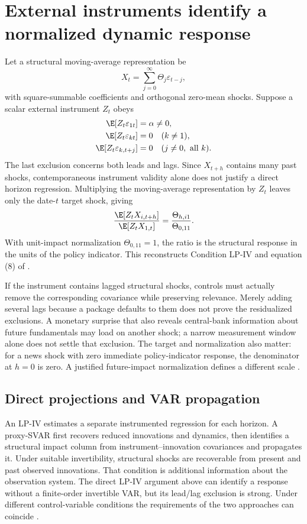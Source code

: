 \section{External instruments identify a normalized dynamic response}
\label{r3:lpiv}
Let a structural moving-average representation be
\[
 X_t=\sum_{j=0}^\infty\Theta_j\varepsilon_{t-j},
\]
with square-summable coefficients and orthogonal zero-mean shocks.
Suppose a scalar external instrument $Z_t$ obeys
\begin{align*}
 \E[Z_t\varepsilon_{1t}]&=\alpha\ne0,\\
 \E[Z_t\varepsilon_{kt}]&=0\quad(k\ne1),\\
 \E[Z_t\varepsilon_{k,t+j}]&=0\quad(j\ne0,\ \text{all }k).
\end{align*}
The last exclusion concerns both leads and lags. Since $X_{t+h}$
contains many past shocks, contemporaneous instrument validity alone
does not justify a direct horizon regression. Multiplying the
moving-average representation by $Z_t$ leaves only the date-$t$
target shock, giving
\begin{equation}
 \frac{\E[Z_tX_{i,t+h}]}{\E[Z_tX_{1,t}]}
       =\frac{\Theta_{h,i1}}{\Theta_{0,11}}.
 \label{r3:lpiv-ratio}
\end{equation}
With unit-impact normalization $\Theta_{0,11}=1$, the ratio is the
structural response in the units of the policy indicator.
This reconstructs Condition LP-IV and equation (8) of
\citet[Sections 2.2--2.3]{stock2018}.

If the instrument contains lagged structural shocks, controls must
actually remove the corresponding covariance while preserving
relevance. Merely adding several lags because a package defaults to
them does not prove the residualized exclusions. A monetary surprise
that also reveals central-bank information about future fundamentals
may load on another shock; a narrow measurement window alone does
not settle that exclusion. The target and normalization also matter:
for a news shock with zero immediate policy-indicator response,
the denominator at $h=0$ is zero. A justified future-impact
normalization defines a different scale
\citep[Sections 2.4--2.5]{stock2018}.

\subsection{Direct projections and VAR propagation}
An LP-IV estimates a separate instrumented regression for each
horizon. A proxy-SVAR first recovers reduced innovations and dynamics,
then identifies a structural impact column from instrument--innovation
covariances and propagates it. Under suitable invertibility,
structural shocks are recoverable from present and past observed
innovations. That condition is additional information about the
observation system. The direct LP-IV argument above can identify a
response without a finite-order invertible VAR, but its lead/lag
exclusion is strong. Under different control-variable conditions
the requirements of the two approaches can coincide
\citep[Sections 2--3]{stock2018}.

